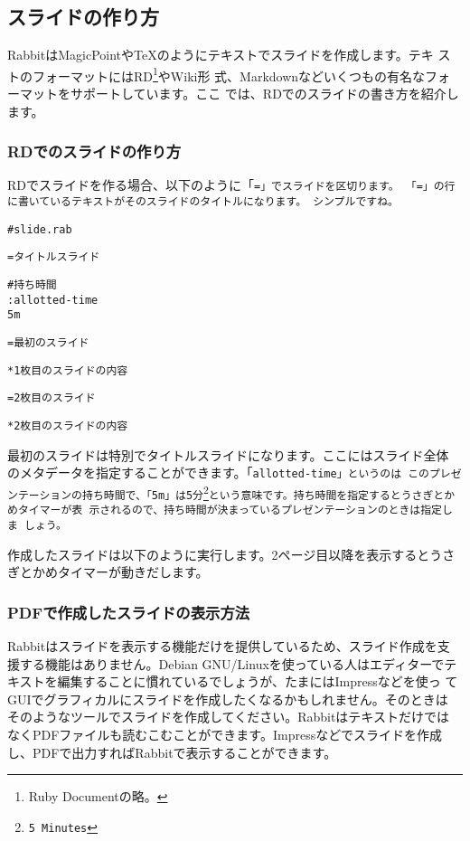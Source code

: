 \documentclass[mingoth,a4paper]{jsarticle}
\begin{document}
\subsection{スライドの作り方}

RabbitはMagicPointや\TeX{}のようにテキストでスライドを作成します。テキ
ストのフォーマットにはRD\footnote{Ruby Documentの略。}やWiki形
式、Markdownなどいくつもの有名なフォーマットをサポートしています。ここ
では、RDでのスライドの書き方を紹介します。

\subsubsection{RDでのスライドの作り方}

RDでスライドを作る場合、以下のように「\tt{=}」でスライドを区切ります。
「\tt{=}」の行に書いているテキストがそのスライドのタイトルになります。
シンプルですね。

\begin{screen}
\begin{alltt}
# slide.rab

= タイトルスライド

# 持ち時間
: allotted-time
   5m

= 最初のスライド

  * 1枚目のスライドの内容

= 2枚目のスライド

  * 2枚目のスライドの内容
\end{alltt}
\end{screen}

最初のスライドは特別でタイトルスライドになります。ここにはスライド全体
のメタデータを指定することができます。「\tt{allotted-time}」というのは
このプレゼンテーションの持ち時間で、「\tt{5m}」は5分\footnote{5
  Minutes}という意味です。持ち時間を指定するとうさぎとかめタイマーが表
示されるので、持ち時間が決まっているプレゼンテーションのときは指定しま
しょう。

作成したスライドは以下のように実行します。2ページ目以降を表示するとうさ
ぎとかめタイマーが動きだします。

\begin{commandline}
\end{commandline}

\subsubsection{PDFで作成したスライドの表示方法}

Rabbitはスライドを表示する機能だけを提供しているため、スライド作成を支
援する機能はありません。Debian GNU/Linuxを使っている人はエディターでテ
キストを編集することに慣れているでしょうが、たまにはImpressなどを使っ
てGUIでグラフィカルにスライドを作成したくなるかもしれません。そのときは
そのようなツールでスライドを作成してください。Rabbitはテキストだけでは
なくPDFファイルも読むこむことができます。Impressなどでスライドを作成
し、PDFで出力すればRabbitで表示することができます。
\end{document}
